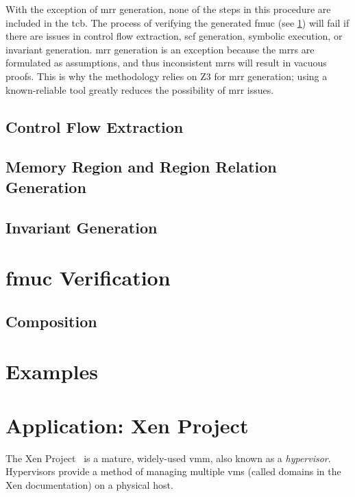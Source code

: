 With the exception of \ac{mrr} generation,
none of the steps in this procedure are included in the \ac{tcb}.
The process of verifying the generated \ac{fmuc} (see \cref{se:fmuc_ver})
will fail if there are issues in control flow extraction,
\ac{scf} generation, symbolic execution, or invariant generation.
\Ac{mrr} generation is an exception
because the \acp{mrr} are formulated as assumptions,
and thus inconsistent \acp{mrr} will result in vacuous proofs.
This is why the methodology relies on Z3 for \ac{mrr} generation;
using a known-reliable tool greatly reduces the possibility of \ac{mrr} issues.

\subsection{Control Flow Extraction}\label{sse:cfg_extract}
\subsection{Memory Region and Region Relation Generation}\label{sse:mem_reg}
\subsection{Invariant Generation}\label{sse:inv_gen}

\section{\acs*{fmuc} Verification}\label{se:fmuc_ver}
\subsection{Composition}\label{sse:fmuc_comp}

\section{Examples}\label{se:syntax_example}

\section{Application: Xen Project}\label{se:xen}
The Xen Project~\citep{chisnall2008definitive}
is a mature, widely-used \ac{vmm}, also known as a \emph{hypervisor}.
Hypervisors provide a method of managing multiple
\acp{vm} (called domains in the Xen documentation) on a physical host.

